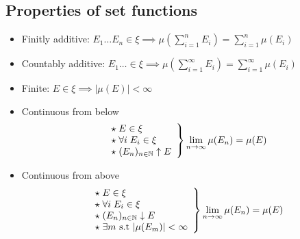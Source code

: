 \subsection{Properties of set functions}
\begin{itemize}

\item Finitly additive: 
 $E_1 \dots E_n \in \xi \implies \mu(\sum_{i=1}^n E_i) = \sum_{i=1}^n \mu(E_i)$
 
\item Countably additive: 
 $E_1 \dots \in \xi \implies \mu(\sum_{i=1}^{\infty} E_i) = \sum_{i=1}^{\infty} \mu(E_i) $

\item Finite: 
 $E \in \xi \implies \left |\mu(E) \right| < \infty $

 \item Continuous from below
\[ \left.
\begin{array}{l l}
\star \; E \in \xi \\
\star \; \forall i \; E_i \in \xi \\
\star \; (E_n)_{n \in \mathbb{N}} \uparrow E \\
\end{array}
\right\} \lim_{n \to\infty}\mu(E_n) = \mu(E) \]

\item Continuous from above
\[ \left.
\begin{array}{l l}
\star \; E \in \xi \\
\star \; \forall i \; E_i \in \xi \\
\star \; (E_n)_{n \in \mathbb{N}} \downarrow E \\
\star \; \exists m$ s.t $|\mu(E_m)| < \infty 
\end{array}
\right\} \lim_{n \to\infty}\mu(E_n) = \mu(E) \]

\end{itemize}


